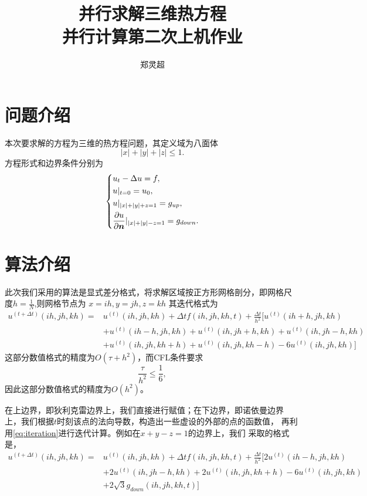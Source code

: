 \documentclass[a4paper,  11pt]{ctexart}
\newcommand\pd[2]{\dfrac{\partial {#1}}{\partial {#2}}}
\newcommand{\bm}[1]{\mbox{\boldmath{$#1$}}}
\begin{document}
\title{并行求解三维热方程 \\ 并行计算第二次上机作业}
\author{郑灵超}
\maketitle
\tableofcontents
\newpage
\section{问题介绍}
本次要求解的方程为三维的热方程问题，其定义域为八面体
\[
 |x|+|y|+|z|\leq 1.
\]
方程形式和边界条件分别为
\begin{equation}
	\label{eq:Heatequation}
	\left\{
	\begin{aligned}
	&u_t-\Delta u = f,  \\
	&u|_{t=0} = u_0, \\
	&u|_{|x|+|y|+z=1} = g_{up}, \\
	&\pd{u}{\bm n}|_{|x|+|y|-z=1} = g_{down}. 
\end{aligned}
\right.
\end{equation}

\section{算法介绍}
此次我们采用的算法是显式差分格式，将求解区域按正方形网格剖分，即网格尺
度$h=\frac 1 N$,则网格节点为
$x=ih,y=jh,z=kh$
其迭代格式为
\begin{equation}
	\begin{aligned}
		\label{eq:iteration}
	u^{(t+\Delta t)}(ih,jh,kh) =& u^{(t)}(ih,jh,kh) +\Delta t
	f(ih,jh,kh,t) 
	 +\frac{\Delta t}{h^2}[
	u^{(t)}(ih+h,jh,kh)  \\  
	& +u^{(t)}(ih-h,jh,kh) 
 	+u^{(t)}(ih,jh+h,kh)+u^{(t)}(ih,jh-h,kh) \\ 
	& +u^{(t)}(ih,jh,kh+h)+u^{(t)}(ih,jh,kh-h) - 6 u^{(t)}(ih,jh,kh)
	]
\end{aligned}
\end{equation}
这部分数值格式的精度为$O(\tau+h^2)$，而CFL条件要求
$$\frac{\tau}{h^2}\leq \frac{1}{6},$$
因此这部分数值格式的精度为$O(h^2)$。

在上边界，即狄利克雷边界上，我们直接进行赋值；在下边界，即诺依曼边界
上，我们根据$t$时刻该点的法向导数，构造出一些虚设的外部的点的函数值，
再利用\eqref{eq:iteration}进行迭代计算。例如在$x+y-z=1$的边界上，我们
采取的格式是，
\begin{equation}
	\label{eq:neumann}
	\begin{aligned}
	u^{(t+\Delta t)}(ih,jh,kh) =& u^{(t)}(ih,jh,kh) +\Delta t
	f(ih,jh,kh,t) 
	 +\frac{\Delta t}{h^2}[
	  2u^{(t)}(ih-h,jh,kh) \\
 	&+ 2u^{(t)}(ih,jh-h,kh)+2u^{(t)}(ih,jh,kh+h)-6 u^{(t)}(ih,jh,kh)\\
	&+ 2\sqrt{3}g_{down}(ih,jh,kh,t)]
	\end{aligned}
\end{equation}
\end{document}
